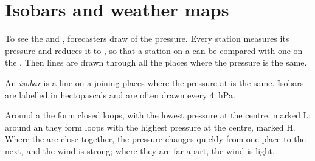 \section{Isobars and weather maps}

To see the  and , forecasters draw  of the
pressure. Every station measures its pressure and reduces it to ,
so that a station on a  can be compared with one on the .
Then lines are drawn through all the places where the pressure is the
same.

\begin{definition}[Isobar]\label{def:g8:fronts-and-weather-maps:isobar}
An \emph{isobar} is a line on a  joining places where
the pressure at  is the same. Isobars are labelled in
hectopascals and are often drawn every \qty{4}{hPa}.
\end{definition}

Around a  the  form closed loops, with the lowest
pressure at the centre, marked L; around an  they form loops
with the highest pressure at the centre, marked H. Where the  are
close together, the pressure changes quickly from one place to the next,
and the wind is strong; where they are far apart, the wind is light.

